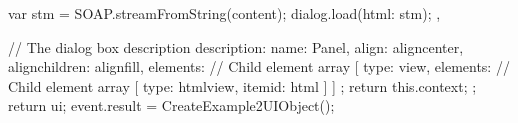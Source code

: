 \documentclass[letterpaper,12pt,english,openany,oneside]{sphinxmanual}
\begin{document}
\begin{sphinxVerbatim}[commandchars=\\\{\}]
               var stm = SOAP.streamFromString(content);
               dialog.load(\PYGZob{}\PYGZdq{}html\PYGZdq{}: stm\PYGZcb{});
           \PYGZcb{},

           // The dialog box description
           description:
           \PYGZob{}
               name: \PYGZdq{}Panel\PYGZdq{},
               align: \PYGZdq{}align\PYGZus{}center\PYGZdq{},
               align\PYGZus{}children: \PYGZdq{}align\PYGZus{}fill\PYGZdq{},
               elements:        // Child element array
               [
                   \PYGZob{}
                       type: \PYGZdq{}view\PYGZdq{},
                       elements:        // Child element array
                       [
                           \PYGZob{}
                               type: \PYGZdq{}html\PYGZus{}view\PYGZdq{},
                               item\PYGZus{}id: \PYGZdq{}html\PYGZdq{}
                           \PYGZcb{}
                       ]
                   \PYGZcb{}
               ]
           \PYGZcb{}
       \PYGZcb{};
       return this.context;
   \PYGZcb{}
\PYGZcb{};
return ui;
\PYGZcb{}
event.result = CreateExample2UIObject();
\end{sphinxVerbatim}



\renewcommand{\indexname}{Index}
\printindex
\end{document}
